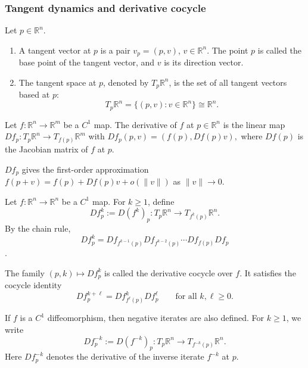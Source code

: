 \subsubsection{Tangent dynamics and derivative cocycle}

\begin{definition}
Let \(p\in \mathbb R^n\). 

\begin{enumerate}[label=(\arabic*)]
    \item A tangent vector at \(p\) is a pair \(v_p = (p, v)\), $v\in \mathbb R^n$. The point \(p\) is called the base point of the tangent vector, and \(v\) is its direction vector. 

    \item The tangent space at \(p\), denoted by \(T_p\mathbb R^n\), is the set of all
    tangent vectors based at \(p\):
    \[
    T_p\mathbb R^n
    =
    \{(p,v):v\in\mathbb R^n\} \cong \mathbb R^n.
    \]
    
\end{enumerate}

\end{definition}

\begin{definition}
Let \(f:\mathbb R^n\to\mathbb R^m\) be a \(C^1\) map. The derivative of \(f\)
at \(p\in\mathbb R^n\) is the linear map
\(
Df_p:T_p\mathbb R^n\to T_{f(p)}\mathbb R^m
\)
with
\(
Df_p(p,v)=(f(p),Df(p)v),
\)
where \(Df(p)\) is the Jacobian matrix of \(f\) at \(p\).

\(Df_p\) gives the first-order approximation
\(
f(p+v)=f(p)+Df(p)v+o(\|v\|)\) as \( \|v\|\to 0.
\)
\end{definition}

\begin{definition}
Let \(f:\mathbb R^n\to\mathbb R^n\) be a \(C^1\) map. For \(k\geq 1\), define
\[
Df_p^k := D(f^k)_p : T_p\mathbb R^n \to T_{f^k(p)}\mathbb R^n .
\]
By the chain rule,
\[
Df_p^k
=
Df_{f^{k-1}(p)}
Df_{f^{k-2}(p)}
\cdots
Df_{f(p)}
Df_p\].


The family
\(
(p,k)\mapsto Df_p^k
\)
is called the derivative cocycle over \(f\). It satisfies the cocycle identity
\[
Df_p^{k+\ell}
=
Df_{f^\ell(p)}^k Df_p^\ell
\qquad
\text{for all } k,\ell\geq 0.
\]
\end{definition}

\begin{remark}
If \(f\) is a \(C^1\) diffeomorphism, then negative iterates are also defined. For
\(k\geq 1\), we write
\[
Df_p^{-k}:=D(f^{-k})_p:T_p\mathbb R^n\to T_{f^{-k}(p)}\mathbb R^n .
\]
Here \(Df_p^{-k}\) denotes the derivative of the inverse iterate \(f^{-k}\) at
\(p\).
\end{remark}



